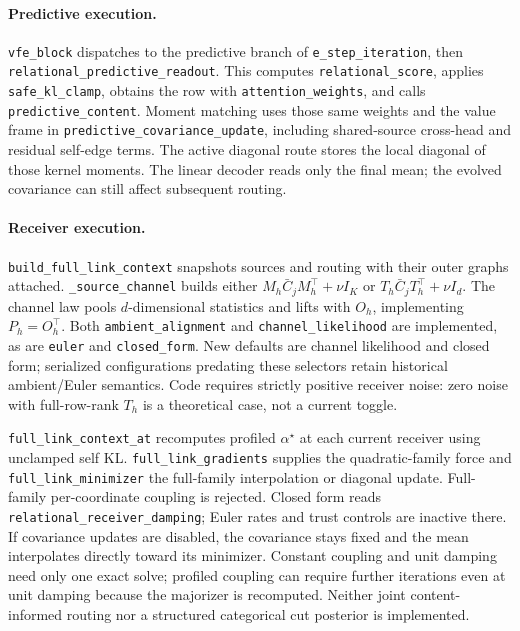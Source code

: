 \documentclass[11pt]{article}
\theoremstyle{definition}
\theoremstyle{remark}
\providecommand{\cfg}[1]{{\small\texttt{#1}}}
\begin{document}
\paragraph{Predictive execution.}
\cfg{vfe\_block} dispatches to the predictive branch of \cfg{e\_step\_iteration}, then \cfg{relational\_predictive\_readout}. This computes \cfg{relational\_score}, applies \cfg{safe\_kl\_clamp}, obtains the row with \cfg{attention\_weights}, and calls \cfg{predictive\_content}. Moment matching uses those same weights and the value frame in \cfg{predictive\_covariance\_update}, including shared-source cross-head and residual self-edge terms. The active diagonal route stores the local diagonal of those kernel moments. The linear decoder reads only the final mean; the evolved covariance can still affect subsequent routing.

\paragraph{Receiver execution.}
\cfg{build\_full\_link\_context} snapshots sources and routing with their outer graphs attached. \cfg{\_source\_channel} builds either $M_h\bar C_jM_h^\top+\nu I_K$ or $T_h\bar C_jT_h^\top+\nu I_d$. The channel law pools $d$-dimensional statistics and lifts with $O_h$, implementing $P_h=O_h^\top$. Both \cfg{ambient\_alignment} and \cfg{channel\_likelihood} are implemented, as are \cfg{euler} and \cfg{closed\_form}. New defaults are channel likelihood and closed form; serialized configurations predating these selectors retain historical ambient/Euler semantics. Code requires strictly positive receiver noise: zero noise with full-row-rank $T_h$ is a theoretical case, not a current toggle.

\cfg{full\_link\_context\_at} recomputes profiled $\alpha^\star$ at each current receiver using unclamped self KL. \cfg{full\_link\_gradients} supplies the quadratic-family force and \cfg{full\_link\_minimizer} the full-family interpolation or diagonal update. Full-family per-coordinate coupling is rejected. Closed form reads \cfg{relational\_receiver\_damping}; Euler rates and trust controls are inactive there. If covariance updates are disabled, the covariance stays fixed and the mean interpolates directly toward its minimizer. Constant coupling and unit damping need only one exact solve; profiled coupling can require further iterations even at unit damping because the majorizer is recomputed. Neither joint content-informed routing nor a structured categorical cut posterior is implemented.
\end{document}
